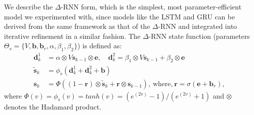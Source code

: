 \documentclass[smallabstract,smallcaptions]{dccpaper}
\begin{document}
We describe the $\Delta$-RNN form, which is the simplest, most parameter-efficient model we experimented with, since models like the LSTM and GRU can be derived from the same framework as that of the $\Delta$-RNN \cite{ororbia2017diff} and integrated into iterative refinement in a similar fashion. The $\Delta$-RNN state function (parameters $\Theta_s = \{V, \mathbf{b}, \mathbf{b}_r, \alpha, \beta_1, \beta_2 \}$) is defined as:
\begin{align}
\mathbf{d}^1_k &= \alpha \otimes V \mathbf{s}_{k-1} \otimes \mathbf{e}, \quad 
\mathbf{d}^2_k = \beta_1 \otimes V \mathbf{s}_{k-1} + \beta_2 \otimes \mathbf{e} \\
\widetilde{\mathbf{s}}_k &= \phi_s(\mathbf{d}^1_k + \mathbf{d}^2_k + \mathbf{b}) \\
\mathbf{s}_k &=  \Phi( (1 - \mathbf{r}) \otimes \widetilde{\mathbf{s}}_k + \mathbf{r} \otimes \mathbf{s}_{k-1} ), \ \mbox{where,} \ \mathbf{r} =  \sigma(\mathbf{e} + \mathbf{b}_r) \label{general_second_order},
\end{align}
where $\Phi(v) = \phi_s(v) = tanh(v) = (e^{(2v)} - 1) / (e^{(2v)} + 1)$ and $\otimes$ denotes the Hadamard product.

\end{document}
